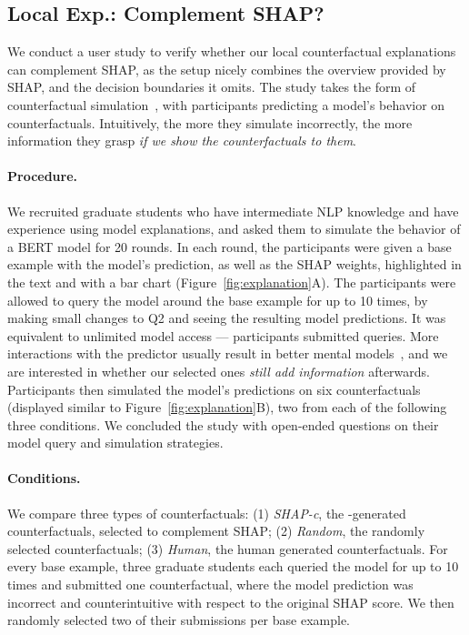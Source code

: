 \subsection{Local Exp.: Complement SHAP?}
We conduct a user study to verify whether our local counterfactual explanations can complement SHAP, as the setup nicely combines the overview provided by SHAP, and the decision boundaries it omits.
The study takes the form of counterfactual simulation~\cite{hase2020evaluating}, with participants predicting a model's behavior on counterfactuals.
Intuitively, the more they simulate incorrectly, the more information they grasp \emph{if we show the counterfactuals to them}.

\paragraph{Procedure.}
We recruited  graduate students who have intermediate NLP knowledge and have experience using model explanations, and asked them to simulate the behavior of a \qqp BERT model for 20 rounds.
In each round, the participants were given a base example with the model's prediction, as well as the SHAP weights, highlighted in the text and with a bar chart (Figure~\ref{fig:explanation}A).
The participants were allowed to query the model around the base example for up to 10 times, by making small changes to Q2 and seeing the resulting model predictions.
It was equivalent to unlimited model access --- participants submitted  queries.
More interactions with the predictor usually result in better mental models~\cite{miller}, and we are interested in whether our selected ones \emph{still add information} afterwards.
Participants then simulated the model's predictions on six counterfactuals (displayed similar to Figure~\ref{fig:explanation}B), two from each of the following three conditions.
We concluded the study with open-ended questions on their model query and simulation strategies.



\newcommand{\cshap}{\emph{SHAP-c}\xspace}
\newcommand{\crandom}{\emph{Random}\xspace}
\newcommand{\chuman}{\emph{Human}\xspace}
\paragraph{Conditions.} 
We compare three types of counterfactuals:
(1) \cshap, the \sysname-generated counterfactuals, selected to complement SHAP; 
(2) \crandom, the randomly selected \sysname counterfactuals; 
(3) \chuman, the human generated counterfactuals.
For every base example, three graduate students each queried the model for up to 10 times and submitted one counterfactual, where the model prediction was incorrect and counterintuitive with respect to the original SHAP score.
We then randomly selected two of their submissions per base example.




